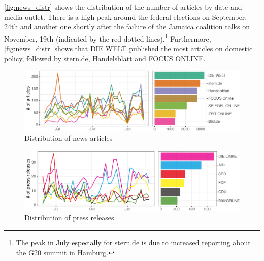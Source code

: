 \documentclass[
]{article}
\begin{document}
\autoref{fig:news_distr} shows the distribution of the number of
articles by date and media outlet. There is a high peak around the
federal elections on September, 24th and another one shortly after the
failure of the Jamaica coalition talks on November, 19th (indicated by
the red dotted lines).\footnote{The peak in July especially for stern.de
  is due to increased reporting about the G20 summit in Hamburg.}
Furthermore, \autoref{fig:news_distr} shows that DIE WELT published the
most articles on domestic policy, followed by stern.de, Handelsblatt and
FOCUS ONLINE.

\begin{figure}

{\centering \includegraphics[width=0.7\linewidth]{main_text_files/figure-latex/Distribution of news articles-1} 

}

\caption{Distribution of news articles \label{fig:news_distr}}\label{fig:Distribution of news articles}
\end{figure}

\begin{figure}

{\centering \includegraphics[width=0.7\linewidth]{main_text_files/figure-latex/Distribution of press releases-1} 

}

\caption{Distribution of press releases \label{fig:press_distr}}\label{fig:Distribution of press releases}
\end{figure}
\end{document}
